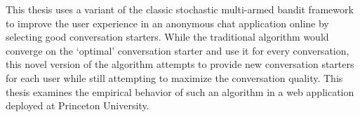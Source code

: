 This thesis uses a variant of the classic stochastic multi-armed bandit framework to improve the user experience in an anonymous chat application online by selecting good conversation starters. While the traditional algorithm would converge on the `optimal' conversation starter and use it for every conversation, this novel version of the algorithm attempts to provide new conversation starters for each user while still attempting to maximize the conversation quality. This thesis examines the empirical behavior of such an algorithm in a web application deployed at Princeton University.
